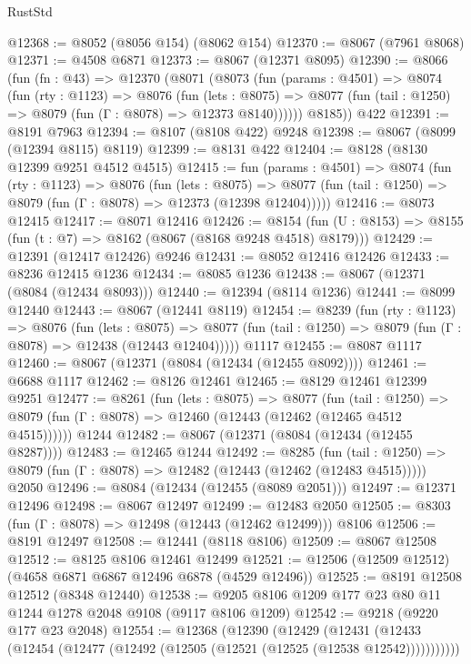 \begin{lexlean}{RustStd}
\begin{coremodule}
@12368 := @8052 (@8056 @154) (@8062 @154)
@12370 := @8067 (@7961 @8068)
@12371 := @4508 @6871
@12373 := @8067 (@12371 @8095)
@12390 := @8066
    (fun (fn : @43) =>
    @12370
      (@8071
        (@8073
          (fun (params : @4501) =>
          @8074
            (fun (rty : @1123) =>
            @8076
              (fun (lets : @8075) =>
              @8077 (fun (tail : @1250) => @8079 (fun (Γ : @8078) => @12373 @8140))))))
        @8185))
    @422
@12391 := @8191 @7963
@12394 := @8107 (@8108 @422) @9248
@12398 := @8067 (@8099 (@12394 @8115) @8119)
@12399 := @8131 @422
@12404 := @8128 (@8130 @12399 @9251 @4512 @4515)
@12415 := fun (params : @4501) =>
  @8074
    (fun (rty : @1123) =>
    @8076
      (fun (lets : @8075) =>
      @8077 (fun (tail : @1250) => @8079 (fun (Γ : @8078) => @12373 (@12398 @12404)))))
@12416 := @8073 @12415
@12417 := @8071 @12416
@12426 := @8154 (fun (U : @8153) => @8155 (fun (t : @7) => @8162 (@8067 (@8168 @9248 @4518) @8179)))
@12429 := @12391 (@12417 @12426) @9246
@12431 := @8052 @12416 @12426
@12433 := @8236 @12415 @1236
@12434 := @8085 @1236
@12438 := @8067 (@12371 (@8084 (@12434 @8093)))
@12440 := @12394 (@8114 @1236)
@12441 := @8099 @12440
@12443 := @8067 (@12441 @8119)
@12454 := @8239
    (fun (rty : @1123) =>
    @8076
      (fun (lets : @8075) =>
      @8077 (fun (tail : @1250) => @8079 (fun (Γ : @8078) => @12438 (@12443 @12404)))))
    @1117
@12455 := @8087 @1117
@12460 := @8067 (@12371 (@8084 (@12434 (@12455 @8092))))
@12461 := @6688 @1117
@12462 := @8126 @12461
@12465 := @8129 @12461 @12399 @9251
@12477 := @8261
    (fun (lets : @8075) =>
    @8077
      (fun (tail : @1250) =>
      @8079 (fun (Γ : @8078) => @12460 (@12443 (@12462 (@12465 @4512 @4515))))))
    @1244
@12482 := @8067 (@12371 (@8084 (@12434 (@12455 @8287))))
@12483 := @12465 @1244
@12492 := @8285
    (fun (tail : @1250) => @8079 (fun (Γ : @8078) => @12482 (@12443 (@12462 (@12483 @4515)))))
    @2050
@12496 := @8084 (@12434 (@12455 (@8089 @2051)))
@12497 := @12371 @12496
@12498 := @8067 @12497
@12499 := @12483 @2050
@12505 := @8303 (fun (Γ : @8078) => @12498 (@12443 (@12462 @12499))) @8106
@12506 := @8191 @12497
@12508 := @12441 (@8118 @8106)
@12509 := @8067 @12508
@12512 := @8125 @8106 @12461 @12499
@12521 := @12506 (@12509 @12512) (@4658 @6871 @6867 @12496 @6878 (@4529 @12496))
@12525 := @8191 @12508 @12512 (@8348 @12440)
@12538 := @9205 @8106 @1209 @177 @23 @80 @11 @1244 @1278 @2048 @9108 (@9117 @8106 @1209)
@12542 := @9218 (@9220 @177 @23 @2048)
@12554 := @12368
    (@12390
      (@12429
        (@12431 (@12433 (@12454 (@12477 (@12492 (@12505 (@12521 (@12525 (@12538 @12542)))))))))))

\end{coremodule}
\end{lexlean}
